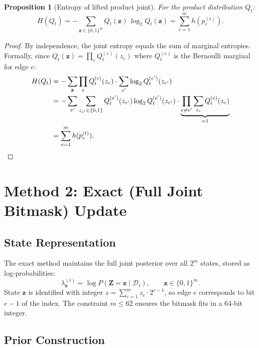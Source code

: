 \documentclass[11pt]{article}
\newtheorem{proposition}{Proposition}
\begin{document}
\begin{proposition}[Entropy of lifted product joint]
\label{prop:lifted-entropy}
For the product distribution $Q_t$:
\[
  H(Q_t) = -\sum_{\mathbf{z} \in \{0,1\}^m} Q_t(\mathbf{z})\,\log_2 Q_t(\mathbf{z})
  = \sum_{e=1}^{m} h(p_e^{(t)}).
\]
\end{proposition}

\begin{proof}
By independence, the joint entropy equals the sum of marginal entropies.
Formally, since $Q_t(\mathbf{z}) = \prod_e Q_t^{(e)}(z_e)$ where
$Q_t^{(e)}$ is the Bernoulli marginal for edge $e$:
\begin{align*}
  H(Q_t)
  &= -\sum_{\mathbf{z}} \prod_e Q_t^{(e)}(z_e) \cdot \sum_{e'} \log_2 Q_t^{(e')}(z_{e'}) \\
  &= -\sum_{e'} \sum_{z_{e'} \in \{0,1\}} Q_t^{(e')}(z_{e'}) \log_2 Q_t^{(e')}(z_{e'})
     \cdot \underbrace{\prod_{e \neq e'} \sum_{z_e} Q_t^{(e)}(z_e)}_{= 1} \\
  &= \sum_{e=1}^{m} h(p_e^{(t)}).  \qedhere
\end{align*}
\end{proof}

\section{Method 2: Exact (Full Joint Bitmask) Update}
\label{sec:exact}

\subsection{State Representation}

The exact method maintains the full joint posterior over all $2^m$ states,
stored as log-probabilities:
\[
  \lambda_{\mathbf{z}}^{(t)}
  = \log P(\mathbf{Z} = \mathbf{z} \mid \mathcal{D}_t),
  \qquad \mathbf{z} \in \{0,1\}^m.
\]
State $\mathbf{z}$ is identified with integer
$z = \sum_{e=1}^m z_e \cdot 2^{e-1}$, so edge $e$ corresponds to bit
$e{-}1$ of the index.  The constraint $m \leq 62$ ensures the bitmask
fits in a 64-bit integer.

\subsection{Prior Construction}
\label{sec:exact-prior}
\end{document}
